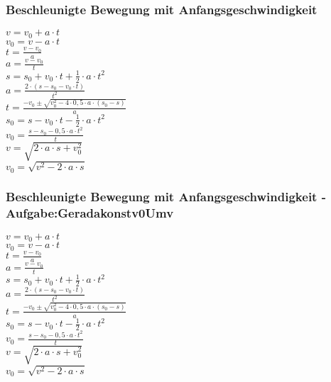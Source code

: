 \subsubsection{Beschleunigte Bewegung mit Anfangsgeschwindigkeit} 
\begin{minipage}{0.45\textwidth} 
$ v = v_{0}  + a\cdot t $\\ 
$ v_{0}  = v - a\cdot t $\\ 
$ t = \frac{v - v_{0} }{a} $\\ 
$ a = \frac{v - v_{0} }{  t} $\\ 
$ s = s_{0}  + v_{0} \cdot t + \frac{1}{2}\cdot a\cdot t^{2} $\\ 
$ a = \frac{2\cdot (s - s_{0}  - v_{0} \cdot t)}{     t^{2} } $\\ 
$ t = \frac{-v_{0}  \pm \sqrt{v_{0} ^{2} -4\cdot 0,5\cdot a\cdot (s_{0}  -s)}}{       a} $\\ 
$ s_{0}  = s - v_{0} \cdot t - \frac{1}{2}\cdot a\cdot t^{2} $\\ 
$ v_{0}  =\frac{s-s_{0} -0,5\cdot a\cdot t^{2} }{    t} $\\ 
$ v  =\sqrt{2\cdot a \cdot s+ v_{0}^2} $\\ 
$ v_{0}  =\sqrt{v^2-2\cdot a \cdot s} $\\ 
\end{minipage} 
\begin{minipage}{0.45\textwidth} 
 
\end{minipage} 
\subsubsection{Beschleunigte Bewegung mit Anfangsgeschwindigkeit - Aufgabe:Geradakonstv0Umv} 
\begin{minipage}{0.45\textwidth} 
$ v = v_{0}  + a\cdot t $\\ 
$ v_{0}  = v - a\cdot t $\\ 
$ t = \frac{v - v_{0} }{a} $\\ 
$ a = \frac{v - v_{0} }{  t} $\\ 
$ s = s_{0}  + v_{0} \cdot t + \frac{1}{2}\cdot a\cdot t^{2} $\\ 
$ a = \frac{2\cdot (s - s_{0}  - v_{0} \cdot t)}{     t^{2} } $\\ 
$ t = \frac{-v_{0}  \pm \sqrt{v_{0} ^{2} -4\cdot 0,5\cdot a\cdot (s_{0}  -s)}}{       a} $\\ 
$ s_{0}  = s - v_{0} \cdot t - \frac{1}{2}\cdot a\cdot t^{2} $\\ 
$ v_{0}  =\frac{s-s_{0} -0,5\cdot a\cdot t^{2} }{    t} $\\ 
$ v  =\sqrt{2\cdot a \cdot s+ v_{0}^2} $\\ 
$ v_{0}  =\sqrt{v^2-2\cdot a \cdot s} $\\ 
\end{minipage} 
\begin{minipage}{0.45\textwidth} 
 
\end{minipage} 
